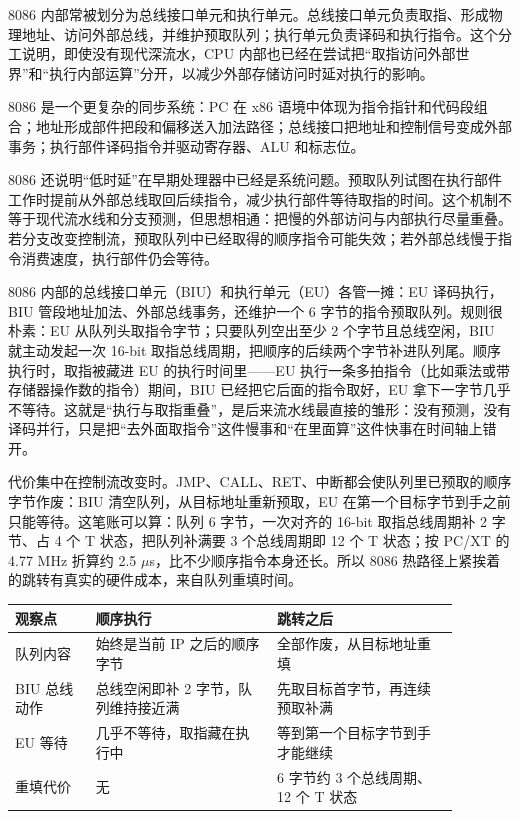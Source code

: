 8086 内部常被划分为总线接口单元和执行单元。总线接口单元负责取指、形成物理地址、访问外部总线，并维护预取队列；执行单元负责译码和执行指令。这个分工说明，即使没有现代深流水，CPU 内部也已经在尝试把“取指访问外部世界”和“执行内部运算”分开，以减少外部存储访问时延对执行的影响。

8086 是一个更复杂的同步系统：PC 在 x86 语境中体现为指令指针和代码段组合；地址形成部件把段和偏移送入加法路径；总线接口把地址和控制信号变成外部事务；执行部件译码指令并驱动寄存器、ALU 和标志位。

8086 还说明“低时延”在早期处理器中已经是系统问题。预取队列试图在执行部件工作时提前从外部总线取回后续指令，减少执行部件等待取指的时间。这个机制不等于现代流水线和分支预测，但思想相通：把慢的外部访问与内部执行尽量重叠。若分支改变控制流，预取队列中已经取得的顺序指令可能失效；若外部总线慢于指令消费速度，执行部件仍会等待。

8086 内部的总线接口单元（BIU）和执行单元（EU）各管一摊：EU 译码执行，BIU 管段地址加法、外部总线事务，还维护一个 6 字节的指令预取队列。规则很朴素：EU 从队列头取指令字节；只要队列空出至少 2 个字节且总线空闲，BIU 就主动发起一次 16-bit 取指总线周期，把顺序的后续两个字节补进队列尾。顺序执行时，取指被藏进 EU 的执行时间里——EU 执行一条多拍指令（比如乘法或带存储器操作数的指令）期间，BIU 已经把它后面的指令取好，EU 拿下一字节几乎不等待。这就是“执行与取指重叠”，是后来流水线最直接的雏形：没有预测，没有译码并行，只是把“去外面取指令”这件慢事和“在里面算”这件快事在时间轴上错开。

代价集中在控制流改变时。JMP、CALL、RET、中断都会使队列里已预取的顺序字节作废：BIU 清空队列，从目标地址重新预取，EU 在第一个目标字节到手之前只能等待。这笔账可以算：队列 6 字节，一次对齐的 16-bit 取指总线周期补 2 字节、占 4 个 T 状态，把队列补满要 3 个总线周期即 12 个 T 状态；按 PC/XT 的 4.77 MHz 折算约 2.5 $\mu$s，比不少顺序指令本身还长。所以 8086 热路径上紧挨着的跳转有真实的硬件成本，来自队列重填时间。

\begin{longtable}{L{0.16\linewidth}L{0.36\linewidth}L{0.36\linewidth}}
\toprule
观察点 & 顺序执行 & 跳转之后 \\
\midrule
队列内容 & 始终是当前 IP 之后的顺序字节 & 全部作废，从目标地址重填 \\\tablerowrule
BIU 总线动作 & 总线空闲即补 2 字节，队列维持接近满 & 先取目标首字节，再连续预取补满 \\\tablerowrule
EU 等待 & 几乎不等待，取指藏在执行中 & 等到第一个目标字节到手才能继续 \\\tablerowrule
重填代价 & 无 & 6 字节约 3 个总线周期、12 个 T 状态 \\
\bottomrule
\end{longtable}

